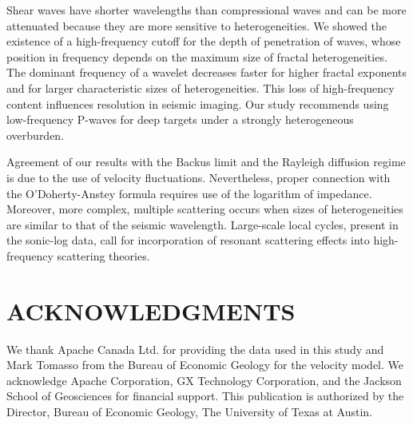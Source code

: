 Shear waves have shorter wavelengths than compressional waves
and can be more attenuated because they are more sensitive to heterogeneities.
We showed the existence of a high-frequency cutoff for the depth of penetration of waves,
whose position in frequency depends on the maximum size of fractal heterogeneities. 
The dominant frequency of a wavelet decreases faster for
higher fractal exponents and for larger characteristic sizes of heterogeneities.
This loss of high-frequency content
influences resolution in seismic imaging.
Our study recommends using low-frequency P-waves for deep targets 
under a strongly heterogeneous overburden.

Agreement of our results with the Backus limit
and the Rayleigh diffusion regime is due to the use of velocity fluctuations.
Nevertheless, proper connection with the O'Doherty-Anstey formula requires
use of the logarithm of impedance.
Moreover, more complex, multiple scattering occurs when sizes of heterogeneities
are similar to that of the seismic wavelength.
Large-scale local cycles, present in the sonic-log data,
call for incorporation of resonant scattering effects
into high-frequency scattering theories.


\section{ACKNOWLEDGMENTS}


We thank Apache Canada Ltd. for providing the data used in this study and Mark Tomasso 
from the Bureau of Economic Geology for the velocity model.
We acknowledge Apache Corporation, GX Technology Corporation, 
and the Jackson School of Geosciences for financial support.
This publication is authorized by the Director, Bureau of Economic Geology,
The University of Texas at Austin.


\label{Odohertyformula}


